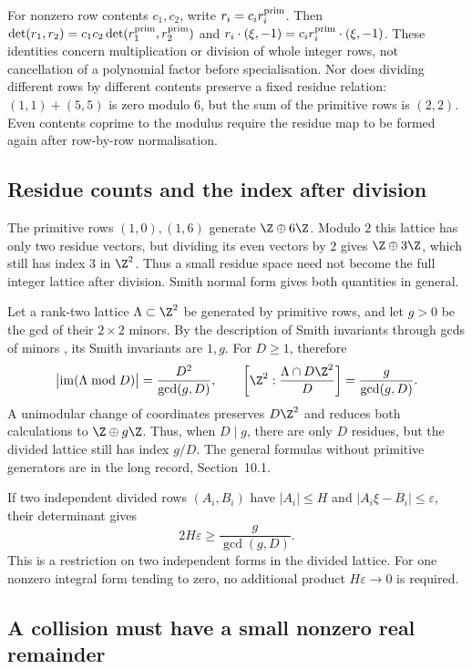 \documentclass[11pt]{article}
\begin{document}
For nonzero row contents $c_1,c_2$, write $r_i=c_ir_i^{\rm prim}$.
Then $\det(r_1,r_2)=c_1c_2\det(r_1^{\rm prim},r_2^{\rm prim})$ and
$r_i\cdot(\xi,-1)=c_i r_i^{\rm prim}\cdot(\xi,-1)$.
These identities concern multiplication or division of whole integer rows,
not cancellation of a polynomial factor before specialisation. Nor does
dividing different rows by different contents preserve a fixed residue
relation: $(1,1)+(5,5)$ is zero modulo $6$, but the sum of the primitive
rows is $(2,2)$. Even contents coprime to the modulus require the residue
map to be formed again after row-by-row normalisation.

\subsection{Residue counts and the index after division}
The primitive rows $(1,0),(1,6)$ generate $\Z\oplus6\Z$. Modulo $2$
this lattice has only two residue vectors, but dividing its even vectors
by $2$ gives $\Z\oplus3\Z$, which still has index $3$ in $\Z^2$.
Thus a small residue space need not become the full integer lattice
after division. Smith normal form gives both quantities in general.

Let a rank-two lattice $\Lambda\subset\Z^2$ be generated by primitive rows,
and let $g>0$ be the gcd of their $2\times2$ minors.  By the description of
Smith invariants through gcds of minors \cite[Thms.~2.3--2.4, p.~3]{stanley2016},
its Smith invariants are $1,g$.  For $D\ge1$, therefore
\[
 \bigl|\operatorname{im}(\Lambda\bmod D)\bigr|
       =\frac{D^2}{\gcd(g,D)},\qquad
 \left[\Z^2:\frac{\Lambda\cap D\Z^2}{D}\right]
       =\frac{g}{\gcd(g,D)}.
\]
A unimodular change of coordinates preserves $D\Z^2$ and reduces
both calculations to $\Z\oplus g\Z$. Thus, when $D\mid g$, there
are only $D$ residues, but the divided lattice still has index $g/D$.
The general formulas without primitive generators are in the long
record, Section~10.1.

If two independent divided rows $(A_i,B_i)$ have $|A_i|\le H$ and
$|A_i\xi-B_i|\le\varepsilon$, their determinant gives
\[
 2H\varepsilon\ge \frac{g}{\gcd(g,D)}.
\]
This is a restriction on two independent forms in the divided lattice.
For one nonzero integral form tending to zero, no additional product
$H\varepsilon\to0$ is required.

\subsection{A collision must have a small nonzero real remainder}
\end{document}
